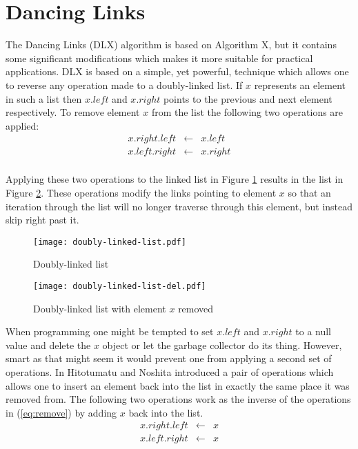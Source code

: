 \section{Dancing Links}
\label{dlx}

The Dancing Links (DLX) algorithm is based on Algorithm X, but it contains some significant modifications which makes it more suitable for practical applications.
DLX is based on a simple, yet powerful, technique which allows one to reverse any operation made to a doubly-linked list.
If $x$ represents an element in such a list then $x.left$ and $x.right$ points to the previous and next element respectively.
To remove element $x$ from the list the following two operations are applied:
\begin{equation}
	\label{eq:remove}
	\begin{array}{rcl}
		x.right.left &\leftarrow& x.left \\
		x.left.right &\leftarrow& x.right \\
	\end{array}
\end{equation}

Applying these two operations to the linked list in Figure \ref{fig:linked} results in the list in Figure \ref{fig:linked_del}.
These operations modify the links pointing to element $x$ so that an iteration through the list will no longer traverse through this element, but instead skip right past it.
\begin{figure}[htbp]
	\centering 
	\texttt{[image: doubly-linked-list.pdf]}
	\caption{Doubly-linked list}
	\label{fig:linked}
\end{figure}
\begin{figure}[htbp]
	\centering 
	\texttt{[image: doubly-linked-list-del.pdf]}
	\caption{Doubly-linked list with element $x$ removed}
	\label{fig:linked_del}
\end{figure}

When programming one might be tempted to set $x.left$ and $x.right$ to a null value and delete the $x$ object or let the garbage collector do its thing.
However, smart as that might seem it would prevent one from applying a second set of operations.
In \cite{Hitotumatu79} Hitotumatu and Noshita introduced a pair of operations which allows one to insert an element back into the list in exactly the same place it was removed from.
The following two operations work as the inverse of the operations in (\ref{eq:remove}) by adding $x$ back into the list.
\begin{equation}
	\label{eq:add}
	\begin{array}{rcl}
		x.right.left &\leftarrow& x \\
		x.left.right &\leftarrow& x \\
	\end{array}
\end{equation}

